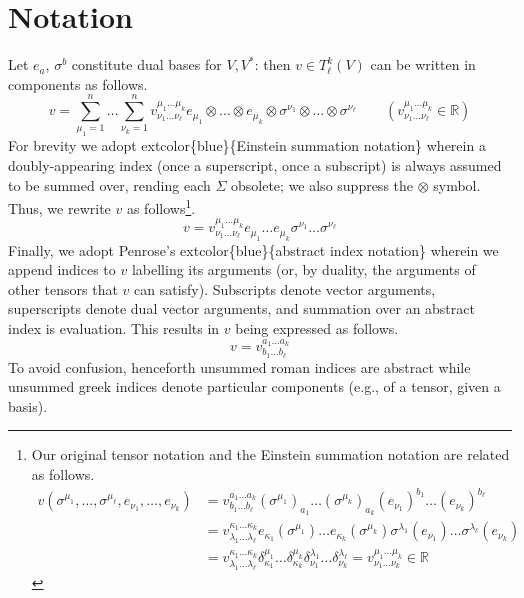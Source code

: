 \documentclass[
]{book}
\begin{document}
\hypertarget{notation}{%
\section{Notation}\label{notation}}

Let \(e_a\), \(\sigma^b\) constitute dual bases for \(V, V^*\): then \(v \in T^k_\ell(V)\) can be written in components as follows.
\begin{equation} 
    v = \sum_{\mu_1 = 1}^n \dots \sum_{\nu_k = 1}^n v^{\mu_1\dots \mu_k}_{\nu_1\dots \nu_\ell} e_{\mu_1} \otimes \dots \otimes e_{\mu_k} \otimes \sigma^{\nu_1} \otimes \dots \otimes \sigma^{\nu_\ell} \qquad (v^{\mu_1\dots \mu_k}_{\nu_1\dots \nu_\ell} \in \mathbb{R}) 
\end{equation}
For brevity we adopt extcolor\{blue\}\{Einstein summation notation\} wherein a doubly-appearing index (once a superscript, once a subscript) is always assumed to be summed over, rending each \(\Sigma\) obsolete; we also suppress the \(\otimes\) symbol. Thus, we rewrite \(v\) as follows\footnote{Our original tensor notation and the Einstein summation notation are related as follows.
  \begin{align*}
  v(\sigma^{\mu_1}, \dots, \sigma^{\mu_\ell}, e_{\nu_1}, \dots, e_{\nu_k}) 
  &= v_{b_1\dots b_\ell}^{a_1\dots a_k}(\sigma^{\mu_1})_{a_1}\dots(\sigma^{\mu_k})_{a_k} (e_{\nu_1})^{b_1} \dots (e_{\nu_k})^{b_\ell}\\
  &= v_{\lambda_1\dots \lambda_\ell}^{\kappa_1\dots \kappa_k} e_{\kappa_1}(\sigma^{\mu_1}) \dots e_{\kappa_k}(\sigma^{\mu_k}) \sigma^{\lambda_1}(e_{\nu_1}) \dots \sigma^{\lambda_\ell}(e_{\nu_k})\\
  &= v_{\lambda_1\dots \lambda_\ell}^{\kappa_1\dots \kappa_k} \delta_{\kappa_1}^{\mu_1} \dots \delta_{\kappa_k}^{\mu_k}\delta^{\lambda_1}_{\nu_1} \dots \delta^{\lambda_\ell}_{\nu_k}
  = v_{\nu_1\dots \nu_k}^{\mu_1\dots \mu_k} \in \mathbb{R}
  \end{align*}}.
\begin{equation} 
    v = v_{\nu_1\dots \nu_\ell}^{\mu_1\dots \mu_k} e_{\mu_1} \dots e_{\mu_k} \sigma^{\nu_1} \dots \sigma^{\nu_\ell}
\end{equation}
Finally, we adopt Penrose's extcolor\{blue\}\{abstract index notation\} wherein we append indices to \(v\) labelling its arguments (or, by duality, the arguments of other tensors that \(v\) can satisfy). Subscripts denote vector arguments, superscripts denote dual vector arguments, and summation over an abstract index is evaluation. This results in \(v\) being expressed as follows.
\begin{equation} 
    v = v_{b_1\dots b_\ell}^{a_1\dots a_k} 
\end{equation}
To avoid confusion, henceforth unsummed roman indices are abstract while unsummed greek indices denote particular components (e.g., of a tensor, given a basis).
\end{document}
